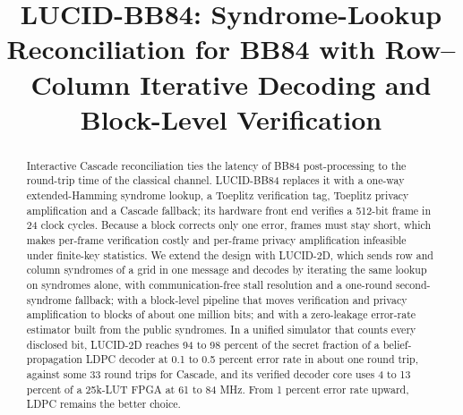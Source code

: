 \documentclass[conference]{IEEEtran}
\begin{document}
\title{LUCID-BB84: Syndrome-Lookup Reconciliation for BB84 with Row--Column Iterative Decoding and Block-Level Verification}

\author{
\and
{}
\and
{}
}

\maketitle

\begin{abstract}
Interactive Cascade reconciliation ties the latency of BB84 post-processing to the round-trip time of the classical channel. LUCID-BB84 replaces it with a one-way extended-Hamming syndrome lookup, a Toeplitz verification tag, Toeplitz privacy amplification and a Cascade fallback; its hardware front end verifies a 512-bit frame in 24 clock cycles. Because a block corrects only one error, frames must stay short, which makes per-frame verification costly and per-frame privacy amplification infeasible under finite-key statistics. We extend the design with LUCID-2D, which sends row and column syndromes of a grid in one message and decodes by iterating the same lookup on syndromes alone, with communication-free stall resolution and a one-round second-syndrome fallback; with a block-level pipeline that moves verification and privacy amplification to blocks of about one million bits; and with a zero-leakage error-rate estimator built from the public syndromes. In a unified simulator that counts every disclosed bit, LUCID-2D reaches 94 to 98 percent of the secret fraction of a belief-propagation LDPC decoder at 0.1 to 0.5 percent error rate in about one round trip, against some 33 round trips for Cascade, and its verified decoder core uses 4 to 13 percent of a 25k-LUT FPGA at 61 to 84 MHz. From 1 percent error rate upward, LDPC remains the better choice.
\end{abstract}
\end{document}
